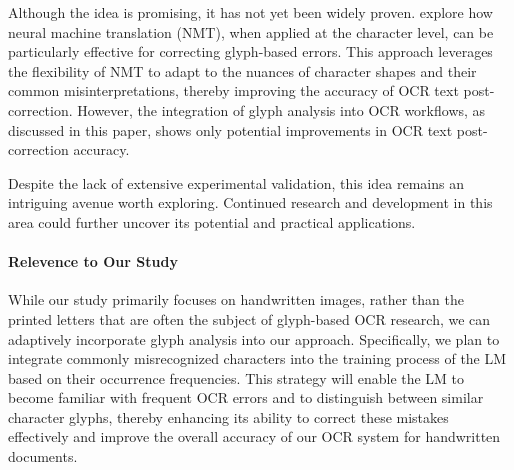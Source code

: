 Although the idea is promising, it has not yet been widely proven. \cite{amrhein2018supervised} explore how neural machine translation (NMT), when applied at the character level, can be particularly effective for correcting glyph-based errors. This approach leverages the flexibility of NMT to adapt to the nuances of character shapes and their common misinterpretations, thereby improving the accuracy of OCR text post-correction. However, the integration of glyph analysis into OCR workflows, as discussed in this paper, shows only potential improvements in OCR text post-correction accuracy.

Despite the lack of extensive experimental validation, this idea remains an intriguing avenue worth exploring. Continued research and development in this area could further uncover its potential and practical applications.

\paragraph*{Relevence to Our Study}
While our study primarily focuses on handwritten images, rather than the printed letters that are often the subject of glyph-based OCR research, we can adaptively incorporate glyph analysis into our approach. Specifically, we plan to integrate commonly misrecognized characters into the training process of the LM based on their occurrence frequencies. This strategy will enable the LM to become familiar with frequent OCR errors and to distinguish between similar character glyphs, thereby enhancing its ability to correct these mistakes effectively and improve the overall accuracy of our OCR system for handwritten documents.